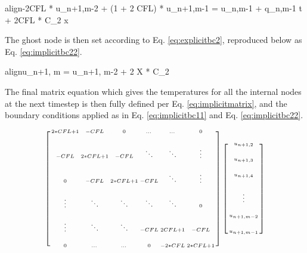\documentclass[10pt, letter, showtrims]{extarticle}
\newcommand{\boxedeq}[2]{\begin{empheq}[box={\fboxsep=6pt\fbox}]{align}\label{#1}#2\end{empheq}}
\begin{document}
    		\boxedeq{eq:implicitbc2}{-2CFL * u_{n+1,m-2} + (1 + 2 CFL) * u_{n+1,m-1} = u_{n,m-1} + q_{n,m-1} \Delta t + 2CFL * C_{2} \Delta x}
    		
    		\noindent
    		The ghost node is then set according to Eq. \ref{eq:explicitbc2}, reproduced below as Eq. \ref{eq:implicitbc22}. \\
    		
    		\boxedeq{eq:implicitbc22}{u_{n+1, m} = u_{n+1, m-2} + 2 \Delta X * C_{2}}	
    		
    		\noindent
    		The final matrix equation which gives the temperatures for all the internal nodes at the next timestep is then fully defined per Eq. \ref{eq:implicitmatrix}, and the boundary conditions applied as in Eq. \ref{eq:implicitbc11} and Eq. \ref{eq:implicitbc22}.

		\begin{fleqn}
			\begin{equation}
			\label{eq:implicitmatrix}
			\setlength{\arraycolsep}{3pt}
				\begin{medsize}
					\begin{bmatrix}
						\begin{smallmatrix}
							2*CFL + 1 & - CFL     & 0         & \dots  & \dots    & 0         \\[1.5em]
							-CFL      & 2*CFL + 1 & -CFL      & \ddots & \ddots   & \vdots    \\[1.5em]
							0         & -CFL      & 2*CFL + 1 & -CFL   & \ddots   & \vdots    \\[1.5em]
							\vdots    & \ddots    & \ddots    & \ddots & \ddots   & 0         \\[1.5em]
							\vdots    & \ddots    & \ddots    & -CFL   & 2CFL + 1 & -CFL      \\[1.5em]
							0         & \dots     & \dots     & 0      & -2*CFL   & 2*CFL + 1 \\
						\end{smallmatrix}
					\end{bmatrix}
					\begin{bmatrix}
						\begin{smallmatrix}
							u_{n+1, 2}   \\[1.5em]
							u_{n+1, 3}   \\[1.5em]
							u_{n+1, 4}   \\[1.5em]
							\vdots       \\[1.5em]
							u_{n+1, m-2} \\[1.5em]
							u_{n+1, m-1}
						\end{smallmatrix}

\end{bmatrix}
\end{medsize}
\end{equation}
\end{fleqn}
\end{document}
